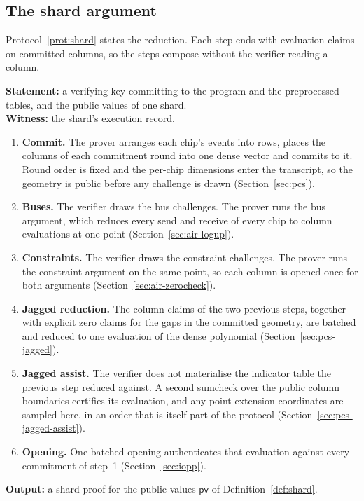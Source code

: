\subsection{The shard argument}
\label{sec:argument-shard}

Protocol~\ref{prot:shard} states the reduction. Each step ends with evaluation claims on committed columns, so the steps compose without the verifier reading a column.

\begin{protocol}
\label{prot:shard}
\textbf{Statement:} a verifying key committing to the program and the
preprocessed tables, and the public values of one shard.\\
\textbf{Witness:} the shard's execution record.
\begin{enumerate}
  \item \textbf{Commit.} The prover arranges each chip's events into rows,
  places the columns of each commitment round into one dense vector and
  commits to it. Round order is fixed and the per-chip dimensions enter the
  transcript, so the geometry is public before any challenge is drawn
  (Section~\ref{sec:pcs}).
  \item \textbf{Buses.} The verifier draws the bus challenges. The prover runs
  the bus argument, which reduces every send and receive of every chip to
  column evaluations at one point (Section~\ref{sec:air-logup}).
  \item \textbf{Constraints.} The verifier draws the constraint challenges. The
  prover runs the constraint argument on the same point, so each column is
  opened once for both arguments (Section~\ref{sec:air-zerocheck}).
  \item \textbf{Jagged reduction.} The column claims of the two previous steps,
  together with explicit zero claims for the gaps in the committed geometry,
  are batched and reduced to one evaluation of the dense polynomial
  (Section~\ref{sec:pcs-jagged}).
  \item \textbf{Jagged assist.} The verifier does not materialise the indicator table
  the previous step reduced against. A second sumcheck over the public column
  boundaries certifies its evaluation, and any point-extension coordinates are sampled
  here, in an order that is itself part of the protocol
  (Section~\ref{sec:pcs-jagged-assist}).
  \item \textbf{Opening.} One batched opening authenticates that evaluation
  against every commitment of step~1 (Section~\ref{sec:iopp}).
\end{enumerate}
\textbf{Output:} a shard proof for the public values $\mathsf{pv}$ of
Definition~\ref{def:shard}.
\end{protocol}

